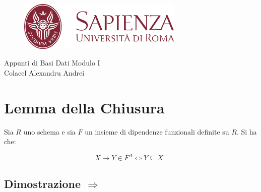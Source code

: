 \documentclass{article}
\title{}
\author{}
\date{\today}
\begin{document}
\pagestyle{fancy}
\fancyhf{}
\rfoot{\thepage}
\lhead{\quad \leftmark}
\rhead{ \quad \rightmark}

\renewcommand{\headrulewidth}{0.2pt}



\begin{titlepage}
    \begin{figure}[t]
        \centering
        \includegraphics[width=0.7\textwidth]{im/logo_sapienza_new.png}
        \label{fig:logo}
    \end{figure}    
    \null\vfill
    \begin{center}
      {\Huge Appunti di Basi Dati Modulo I} \\[2cm]
      {\Large Colacel Alexandru Andrei}
    \end{center}
    \vfill\null
    \renewcommand{\abstractname}{Disclaimer}

    
    
    \begin{abstract}  
    
    \hrulefill


    Le fonti sono le "Hand Notes" del prof. Perelli tradotte in italiano, appunti presi dalle slides della prof. De Marsico ed eventuali e-mail.\\
    \textbf{Nota: è vietata assolutamente la vendita di questo materiale in qualsiasi forma senza il mio consenso.} 
    \hrulefill
    \end{abstract}
  \end{titlepage}


\pagebreak
\tableofcontents

\pagebreak


\section{Lemma della Chiusura}
Sia $R$ uno schema e sia $F$ un insieme di dipendenze funzionali definite su $R$. Si ha che:\par 
\[X \rightarrow Y \in F^{A} \Longleftrightarrow Y \subseteq X^{+}\]

\subsection{Dimostrazione $\Rightarrow$}
\end{document}
